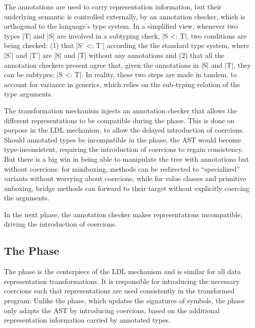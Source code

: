 The annotations are used to carry representation information, but their underlying semantic is controlled externally, by an annotation checker, which is orthogonal to the language's type system. In a simplified view, whenever two types |T| and |S| are involved in a subtyping check, |S <: T|, two conditions are being checked: (1) that |S' <: T'| according the the standard type system, where |S'| and |T'| are |S| and |T| without any annotations and (2) that all the annotation checkers present agree that, given the annotations in |S| and |T|, they can be subtypes: |S <: T|. In reality, these two steps are made in tandem, to account for variance in generics, which relies on the sub-typing relation of the type arguments.

The transformation mechanism injects an annotation checker that allows the different representations to be compatible during the \inject{} phase. This is done on purpose in the LDL mechanism, to allow the delayed introduction of coercions. Should annotated types be incompatible in the \inject{} phase, the AST would become type-inconsistent, requiring the introduction of coercions to regain consistency. But there is a big win in being able to manipulate the tree with annotations but without coercions: for miniboxing, methods can be redirected to ``specialized'' variants without worrying about coercions, while for value classes and primitive unboxing, bridge methods can forward to their target without explicitly coercing the arguments.

In the next phase, the annotation checker makes representations incompatible, driving the introduction of coercions.

\subsection{The \Coerce{} Phase}
\label{ldl:sec:transform:coerce}

The \coerce{} phase is the centerpiece of the LDL mechanism and is similar for all data representation transformations. It is responsible for introducing the necessary coercions such that representations are used consistently in the transformed program. Unlike the \inject{} phase, which updates the signatures of symbols, the \coerce{} phase only adapts the AST by introducing coercions, based on the additional representation information carried by annotated types.

